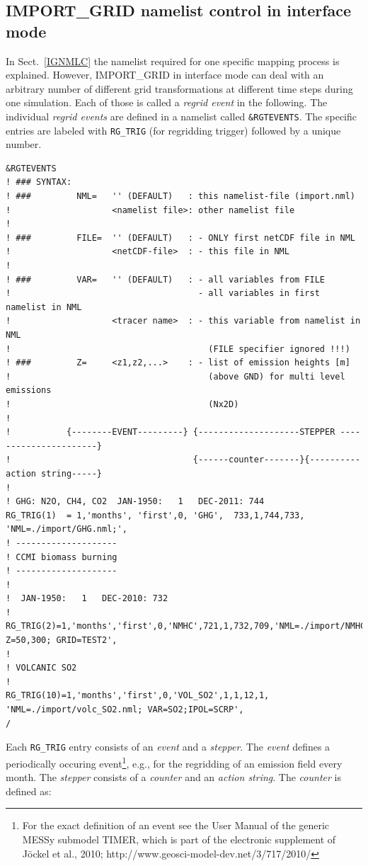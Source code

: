 \documentclass[11pt,twoside]{report}
\begin{document}
\subsection{IMPORT\_GRID namelist control in interface mode\label{IMPORTGNML}}
In Sect.~\ref{IGNMLC} the namelist required for one specific mapping
process is explained. 
However, IMPORT\_GRID in interface mode can deal with an arbitrary number
of different grid transformations at different time steps 
during one simulation. Each of those is called a {\it regrid event} in
the following. 
The individual {\it regrid events} are defined in a namelist
called \verb|&RGTEVENTS|. The specific entries are labeled
with \verb|RG_TRIG| (for regridding trigger) followed by a unique
number. 
{\footnotesize
\begin{verbatim}
&RGTEVENTS
! ### SYNTAX:
! ###         NML=   '' (DEFAULT)   : this namelist-file (import.nml)
!                    <namelist file>: other namelist file
!
! ###         FILE=  '' (DEFAULT)   : - ONLY first netCDF file in NML
!                    <netCDF-file>  : - this file in NML
!
! ###         VAR=   '' (DEFAULT)   : - all variables from FILE
!                                     - all variables in first namelist in NML
!                    <tracer name>  : - this variable from namelist in NML
!                                       (FILE specifier ignored !!!)
! ###         Z=     <z1,z2,...>    : - list of emission heights [m]
!                                       (above GND) for multi level emissions
!                                       (Nx2D)
!        
!           {--------EVENT---------} {--------------------STEPPER ----------------------}    
!                                    {------counter-------}{----------action string-----}    
!
! GHG: N2O, CH4, CO2  JAN-1950:   1   DEC-2011: 744
RG_TRIG(1)  = 1,'months', 'first',0, 'GHG',  733,1,744,733, 'NML=./import/GHG.nml;',
! --------------------
! CCMI biomass burning
! --------------------
!
!  JAN-1950:   1   DEC-2010: 732
!
RG_TRIG(2)=1,'months','first',0,'NMHC',721,1,732,709,'NML=./import/NMHC_BB.nml; Z=50,300; GRID=TEST2',
!
! VOLCANIC SO2
!
RG_TRIG(10)=1,'months','first',0,'VOL_SO2',1,1,12,1, 'NML=./import/volc_SO2.nml; VAR=SO2;IPOL=SCRP',
/
\end{verbatim}
}
Each \verb|RG_TRIG| entry consists of an {\it event} and a {\it stepper}. 
The {\it event} defines a periodically occuring event\footnote{\label{TUM}For the exact definition
 of an event see the User Manual  of the generic MESSy submodel TIMER, which is
 part of  the  electronic supplement of J\"ockel et al., 2010;
 http://www.geosci-model-dev.net/3/717/2010/}, e.g., for
 the regridding of an emission field every month.
The {\it stepper} consists of a {\it counter} and an {\it action string}. The  {\it counter} is defined as:\\
\end{document}
